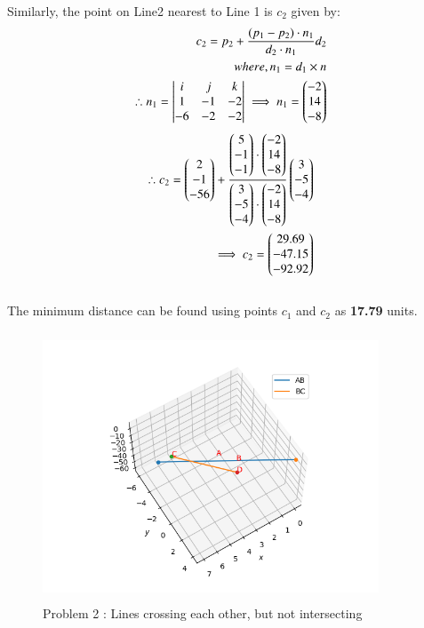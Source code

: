 \documentclass[journal,12pt,twocolumn]{IEEEtran}
\begin{document}
Similarly, the point on Line2 nearest to Line 1 is $c_2$ given by:\\
\begin{align}
c_2=p_2+\frac{(p_1-p_2)\cdot n_1}{d_2\cdot n_1}d_2 \\
where, n_1=d_1\times n\\
 \therefore n_1=\begin{vmatrix}i & j & k\\1 &-1 &-2\\-6&-2&-2\end{vmatrix}
\implies n_1=\begin{pmatrix}-2 \\ 14 \\ -8\end{pmatrix}
\end{align}
\begin{align}
\therefore c_2= \begin{pmatrix}2\\-1\\-56\end{pmatrix}+\frac{\begin{pmatrix}5\\-1\\-1\end{pmatrix}\cdot \begin{pmatrix}-2\\14\\-8\end{pmatrix}}{\begin{pmatrix}3\\-5\\-4\end{pmatrix}\cdot \begin{pmatrix}-2\\14\\-8\end{pmatrix}}\begin{pmatrix}3\\-5\\-4\end{pmatrix}\\
\implies c_2=\begin{pmatrix}29.69\\ -47.15\\ -92.92\end{pmatrix}
\end{align}
\\
The minimum distance can be found using points $c_1$ and $c_2$ as \textbf{17.79} units.
\newpage
\begin{figure}[h!]
\centering
\includegraphics[width=10cm, height=8cm]{Figure_2}
\caption{Problem 2 : Lines crossing each other, but not intersecting}
\label{Fig4}
\end{figure}
\end{document}
